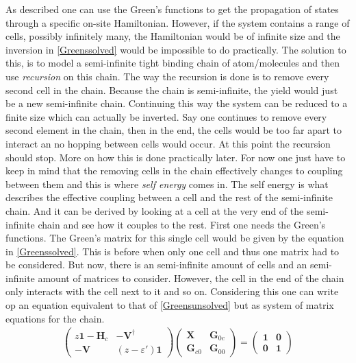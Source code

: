 As described  one can use the Green's functions to get the propagation of states through a specific on-site Hamiltonian. However, if the system contains a range of cells, possibly infinitely many, the Hamiltonian would be of infinite size and the inversion in \cref{Greenssolved} would be impossible to do practically. The solution to this, is to model a semi-infinite tight binding chain of atom/molecules and then use \textit{recursion} on this chain. The way the recursion is done is to remove every second cell in the chain. Because the chain is semi-infinite, the yield would just be a new semi-infinite chain. Continuing this way the system can be reduced to a finite size which can actually be inverted. Say one continues to remove every second element in the chain, then in the end, the cells would be too far apart to interact an no hopping between cells would occur. At this point the recursion should stop. More on how this is done practically later.  For now one just have to keep in mind that the removing cells in the chain effectively changes to coupling between them and this is where \textit{self energy} comes in. The self energy is what describes the effective coupling between a cell and the rest of the semi-infinite chain. And it can be derived by looking at a cell at the very end of the semi-infinite chain and see how it couples to the rest. First one needs the Green's functions. The Green's matrix for this single cell would be given by the equation in \cref{Greenssolved}. This is before when only one cell and thus one matrix had to be considered. But now, there is an semi-infinite amount of cells and an semi-infinite amount of matrices to consider. However, the cell in the end of the chain only interacts with the cell next to it and so on. Considering this one can write op an equation equivalent to that of \cref{Greensunsolved} but as system of matrix equations for the chain.
\begin{align}\label{Greenssystem}
	\begin{pmatrix}
		z\mathbf{1}-\mathbf{H}_c & -\mathbf{V}^{\dagger} \\ -\mathbf{V} & (z-\varepsilon')\mathbf{1}
	\end{pmatrix}
	\begin{pmatrix}
		\mathbf{X}      & \mathbf{G}_{0c} \\
		\mathbf{G}_{c0} & \mathbf{G}_{00}
	\end{pmatrix}
	=
	\begin{pmatrix}
		\mathbf{1} & \mathbf{0} \\
		\mathbf{0} & \mathbf{1}
	\end{pmatrix}
\end{align}
